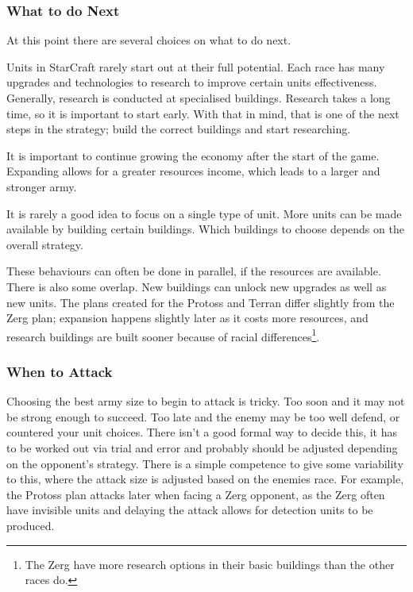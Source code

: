 \documentclass[11pt,openright,a4paper]{report}
\begin{document}
\subsubsection{What to do Next}
At this point there are several choices on what to do next.
\begin{description}[leftmargin=1.5cm,labelindent=1cm]
\item[Research upgrades]{Units in StarCraft rarely start out at their full potential. Each race has many upgrades and technologies to research to improve certain units effectiveness. Generally, research is conducted at specialised buildings. Research takes a long time, so it is important to start early. With that in mind, that is one of the next steps in the strategy; build the correct buildings and start researching.}
\item[Expand to new bases]{It is important to continue growing the economy after the start of the game. Expanding allows for a greater resources income, which leads to a larger and stronger army.}
\item[Produce different units]{It is rarely a good idea to focus on a single type of unit. More units can be made available by building certain buildings. Which buildings to choose depends on the overall strategy.}
\end{description}
These behaviours can often be done in parallel, if the resources are available. There is also some overlap. New buildings can unlock new upgrades as well as new units. The plans created for the Protoss and Terran differ slightly from the Zerg plan; expansion happens slightly later as it costs more resources, and research buildings are built sooner because of racial differences\footnote{The Zerg have more research options in their basic buildings than the other races do.}.

\subsubsection{When to Attack}
Choosing the best army size to begin to attack is tricky. Too soon and it may not be strong enough to succeed. Too late and the enemy may be too well defend, or countered your unit choices. There isn't a good formal way to decide this, it has to be worked out via trial and error and probably should be adjusted depending on the opponent's strategy. There is a simple competence to give some variability to this, where the attack size is adjusted based on the enemies race. For example, the Protoss plan attacks later when facing a Zerg opponent, as the Zerg often have invisible units and delaying the attack allows for detection units to be produced.
\end{document}
